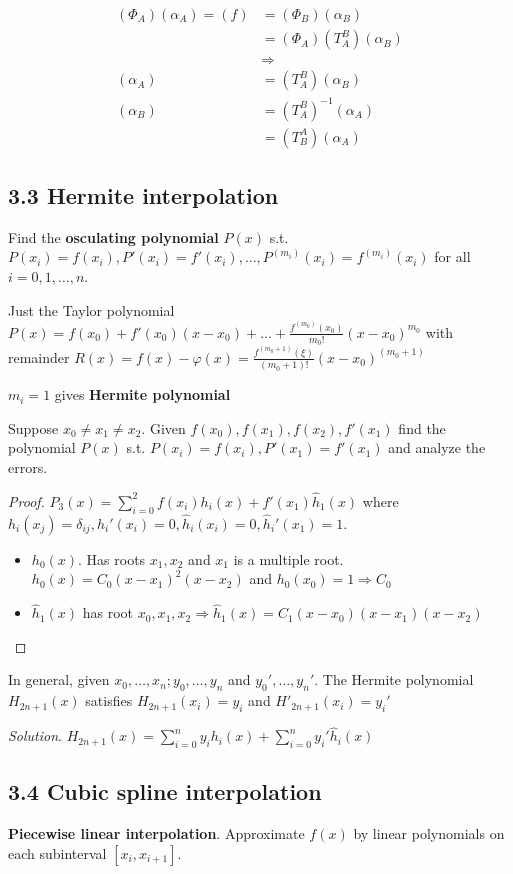 \documentclass[11pt]{article}
\begin{document}
\begin{align*}
(\Phi_A)(\alpha_A)=(f)&=(\Phi_B)(\alpha_B)\\
&=(\Phi_A)(T_A^B)(\alpha_B)\\
&\Rightarrow\\
(\alpha_A)&=(T_A^B)(\alpha_B)\\
(\alpha_B)&=(T_A^B)^{-1}(\alpha_A)\\
&=(T_B^A)(\alpha_A)
\end{align*}
\subsection{3.3 Hermite interpolation}
\label{sec:org37eeda3}
Find the \textbf{osculating polynomial} \(P(x)\) s.t. \(P(x_i)=f(x_i),
   P'(x_i)=f'(x_i),\dots,P^{(m_i)}(x_i)=f^{(m_i)}(x_i)\) for all \(i=0,1,\dots,n\).

Just the Taylor polynomial \(P(x)=f(x_0)+f'(x_0)(x-x_0)+\dots+
   \frac{f^{(m_0)}(x_0)}{m_0!}(x-x_0)^{m_0}\) with remainder 
\(R(x)=f(x)-\varphi(x)=\frac{f^{(m_0+1)}(\xi)}{(m_0+1)!}(x-x_0)^{(m_0+1)}\)

\(m_i = 1\) gives \textbf{Hermite polynomial}

\begin{example}
Suppose $x_0\neq x_1\neq x_2$. Given $f(x_0),f(x_1), f(x_2),
f'(x_1)$ find the polynomial $P(x)$ s.t. $P(x_i)=f(x_i),P'(x_1)=f'(x_1)$ and
analyze the errors.
\end{example}

\begin{proof}
$P_3(x)=\displaystyle\sum_{i=0}^2f(x_i)h_i(x)+f'(x_1)\hat{h}_1(x)$ where
$h_i(x_j)=\delta_{ij},h_i'(x_i)=0,\hat{h}_i(x_i)=0,\hat{h}_i'(x_1)=1$.
\begin{itemize}
\item $h_0(x)$. Has roots $x_1,x_2$ and $x_1$ is a multiple root.
      $h_0(x)=C_0(x-x_1)^2(x-x_2)$ and $h_0(x_0)=1\Longrightarrow C_0$
\item $\hat{h}_1(x)$ has root $x_0,x_1,x_2\Longrightarrow 
      \hat{h}_1(x)=C_1(x-x_0)(x-x_1)(x-x_2)$
\end{itemize}
\end{proof}

In general, given \(x_0,\dots,x_n;y_0,\dots,y_n\) and \(y_0',\dots,y_n'\). The
Hermite polynomial \(H_{2n+1}(x)\) satisfies \(H_{2n+1}(x_i)=y_i\) and
\(H'_{2n+1}(x_i)=y_i'\) 

\emph{Solution}.
\(H_{2n+1}(x)=\displaystyle\sum_{i=0}^ny_ih_i(x)+\displaystyle\sum_{i=0}^ny_i'
   \hat{h}_i(x)\)
\subsection{3.4 Cubic spline interpolation}
\label{sec:orgc05a8b6}
\textbf{Piecewise linear interpolation}. Approximate \(f(x)\) by linear polynomials on
each subinterval \([x_i,x_{i+1}]\).
\end{document}
